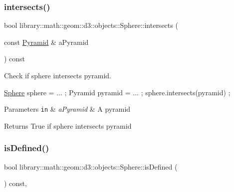 \subsubsection{\texorpdfstring{intersects()}{intersects()}\hspace{0.1cm}{\footnotesize\ttfamily [8/8]}}
{\footnotesize\ttfamily bool library\+::math\+::geom\+::d3\+::objects\+::\+Sphere\+::intersects (\begin{DoxyParamCaption}\item[{const \hyperlink{classlibrary_1_1math_1_1geom_1_1d3_1_1objects_1_1_pyramid}{Pyramid} \&}]{a\+Pyramid }\end{DoxyParamCaption}) const}



Check if sphere intersects pyramid. 


\begin{DoxyCode}
\hyperlink{classlibrary_1_1math_1_1geom_1_1d3_1_1objects_1_1_sphere_a55dccc8ea16ee55cd7694c26afa8ea39}{Sphere} sphere = ... ;
Pyramid pyramid = ... ;
sphere.intersects(pyramid) ;
\end{DoxyCode}



\begin{DoxyParams}[1]{Parameters}
\mbox{\tt in}  & {\em a\+Pyramid} & A pyramid \\
\hline
\end{DoxyParams}
\begin{DoxyReturn}{Returns}
True if sphere intersects pyramid 
\end{DoxyReturn}
\mbox{\label{classlibrary_1_1math_1_1geom_1_1d3_1_1objects_1_1_sphere_a0598bd75f8a34e07a3ad36cf10a7f098}} 
\subsubsection{\texorpdfstring{is\+Defined()}{isDefined()}}
{\footnotesize\ttfamily bool library\+::math\+::geom\+::d3\+::objects\+::\+Sphere\+::is\+Defined (\begin{DoxyParamCaption}{ }\end{DoxyParamCaption}) const\hspace{0.3cm}{\ttfamily [override]}, {\ttfamily [virtual]}}



